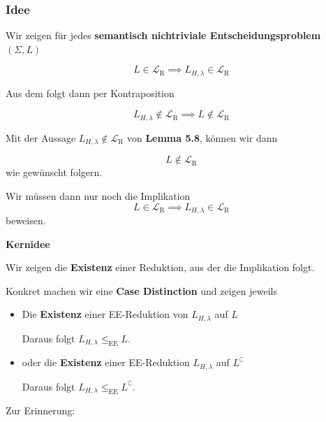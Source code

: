 \documentclass[a4paper, 11pt]{article}
\def\Lr{\mathcal{L}_\text{R}}
\begin{document}
                        \subsubsection{Idee}
                        Wir zeigen für jedes \textbf{semantisch nichtriviale Entscheidungsproblem} $(\Sigma, L)$
                        
                        $$L \in \Lr \implies L_{H, \lambda} \in \Lr$$
                        
                        Aus dem folgt dann per Kontraposition 
                    
                        $$L_{H, \lambda} \notin \Lr \implies L \notin \Lr$$
                        
                        Mit der Aussage $L_{H, \lambda} \notin \Lr$ von \textbf{Lemma 5.8}, können wir dann 
                    
                        $$L \notin \Lr$$
                        wie gewünscht folgern.
                    
                    
                        Wir müssen dann nur noch die Implikation 
                        $$L \in \Lr \implies L_{H, \lambda} \in \Lr$$
                        beweisen.
                        
                    
                        \textbf{Kernidee}
                        \begin{center}
                            Wir zeigen die \textbf{Existenz} einer Reduktion, aus der die Implikation folgt. 
                        \end{center}
                        
                        Konkret machen wir eine \textbf{Case Distinction} und zeigen jeweils 
                        \begin{itemize}[label=-]
                            \item Die \textbf{Existenz} einer EE-Reduktion von $L_{H, \lambda}$ auf  $L$
                            
                            Daraus folgt $L_{H, \lambda} \leq_{\text{EE}} L$.
                            \item oder die \textbf{Existenz} einer EE-Reduktion $L_{H, \lambda} $ auf $ L^\complement$
                            
                            Daraus folgt $L_{H, \lambda} \leq_{\text{EE}} L^\complement$.
                        \end{itemize}
                        Zur Erinnerung:
                    
\end{document}
